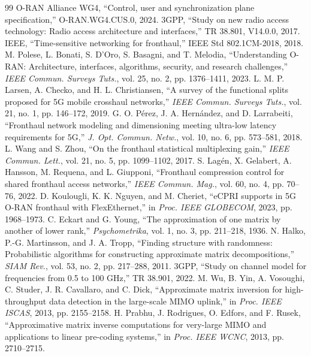 \clearpage
{}
{}
\begin{thebibliography}{99}
\setlength{\itemsep}{2pt}
 O-RAN Alliance WG4, ``Control, user and synchronization plane specification,'' O-RAN.WG4.CUS.0, 2024.
 3GPP, ``Study on new radio access technology: Radio access architecture and interfaces,'' TR 38.801, V14.0.0, 2017.
 IEEE, ``Time-sensitive networking for fronthaul,'' IEEE Std 802.1CM-2018, 2018.
 M. Polese, L. Bonati, S. D'Oro, S. Basagni, and T. Melodia, ``Understanding O-RAN: Architecture, interfaces, algorithms, security, and research challenges,'' \emph{IEEE Commun. Surveys Tuts.}, vol. 25, no. 2, pp. 1376--1411, 2023.
 L. M. P. Larsen, A. Checko, and H. L. Christiansen, ``A survey of the functional splits proposed for 5G mobile crosshaul networks,'' \emph{IEEE Commun. Surveys Tuts.}, vol. 21, no. 1, pp. 146--172, 2019.
 G. O. P\'erez, J. A. Hern\'andez, and D. Larrabeiti, ``Fronthaul network modeling and dimensioning meeting ultra-low latency requirements for 5G,'' \emph{J. Opt. Commun. Netw.}, vol. 10, no. 6, pp. 573--581, 2018.
 L. Wang and S. Zhou, ``On the fronthaul statistical multiplexing gain,'' \emph{IEEE Commun. Lett.}, vol. 21, no. 5, pp. 1099--1102, 2017.
 S. Lag\'en, X. Gelabert, A. Hansson, M. Requena, and L. Giupponi, ``Fronthaul compression control for shared fronthaul access networks,'' \emph{IEEE Commun. Mag.}, vol. 60, no. 4, pp. 70--76, 2022.
 D. Koulougli, K. K. Nguyen, and M. Cheriet, ``eCPRI supports in 5G O-RAN fronthaul with FlexEthernet,'' in \emph{Proc. IEEE GLOBECOM}, 2023, pp. 1968--1973.
 C. Eckart and G. Young, ``The approximation of one matrix by another of lower rank,'' \emph{Psychometrika}, vol. 1, no. 3, pp. 211--218, 1936.
 N. Halko, P.-G. Martinsson, and J. A. Tropp, ``Finding structure with randomness: Probabilistic algorithms for constructing approximate matrix decompositions,'' \emph{SIAM Rev.}, vol. 53, no. 2, pp. 217--288, 2011.
 3GPP, ``Study on channel model for frequencies from 0.5 to 100 GHz,'' TR 38.901, 2022.
 M. Wu, B. Yin, A. Vosoughi, C. Studer, J. R. Cavallaro, and C. Dick, ``Approximate matrix inversion for high-throughput data detection in the large-scale MIMO uplink,'' in \emph{Proc. IEEE ISCAS}, 2013, pp. 2155--2158.
 H. Prabhu, J. Rodrigues, O. Edfors, and F. Rusek, ``Approximative matrix inverse computations for very-large MIMO and applications to linear pre-coding systems,'' in \emph{Proc. IEEE WCNC}, 2013, pp. 2710--2715.

\end{thebibliography}
